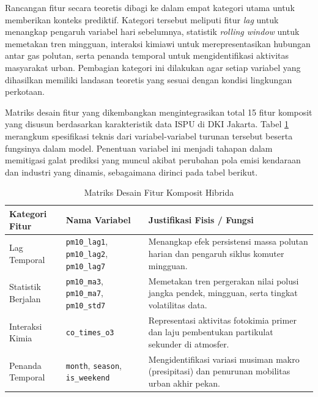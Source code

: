 Rancangan fitur secara teoretis dibagi ke dalam empat kategori utama untuk memberikan konteks prediktif. Kategori tersebut meliputi fitur \textit{lag} untuk menangkap pengaruh variabel hari sebelumnya, statistik \textit{rolling window} untuk memetakan tren mingguan, interaksi kimiawi untuk merepresentasikan hubungan antar gas polutan, serta penanda temporal untuk mengidentifikasi aktivitas masyarakat urban. Pembagian kategori ini dilakukan agar setiap variabel yang dihasilkan memiliki landasan teoretis yang sesuai dengan kondisi lingkungan perkotaan.

Matriks desain fitur yang dikembangkan mengintegrasikan total 15 fitur komposit yang disusun berdasarkan karakteristik data ISPU di DKI Jakarta. Tabel \ref{tbl:matriks_fitur} merangkum spesifikasi teknis dari variabel-variabel turunan tersebut beserta fungsinya dalam model. Penentuan variabel ini menjadi tahapan dalam memitigasi galat prediksi yang muncul akibat perubahan pola emisi kendaraan dan industri yang dinamis, sebagaimana dirinci pada tabel berikut.

\begin{table}[htbp]
\centering
\captionsetup{justification=centering}
\setlength{\tabcolsep}{6pt}
\caption{Matriks Desain Fitur Komposit Hibrida}
\label{tbl:matriks_fitur}

\begin{tabularx}{\textwidth}{|>{\raggedright\arraybackslash}p{2.8cm}|
                              >{\raggedright\arraybackslash}p{3.8cm}|
                              >{\raggedright\arraybackslash}X|}
\hline
\textbf{Kategori Fitur} & \textbf{Nama Variabel} & \textbf{Justifikasi Fisis / Fungsi} \\
\hline
Lag Temporal & \texttt{pm10\_lag1}, \texttt{pm10\_lag2}, \texttt{pm10\_lag7} & Menangkap efek persistensi massa polutan harian dan pengaruh siklus komuter mingguan. \\
\hline
Statistik Berjalan & \texttt{pm10\_ma3}, \texttt{pm10\_ma7}, \texttt{pm10\_std7} & Memetakan tren pergerakan nilai polusi jangka pendek, mingguan, serta tingkat volatilitas data. \\
\hline
Interaksi Kimia & \texttt{co\_times\_o3} & Representasi aktivitas fotokimia primer dan laju pembentukan partikulat sekunder di atmosfer. \\
\hline
Penanda Temporal & \texttt{month}, \texttt{season}, \texttt{is\_weekend} & Mengidentifikasi variasi musiman makro (presipitasi) dan penurunan mobilitas urban akhir pekan. \\
\hline
\end{tabularx}
\end{table}

